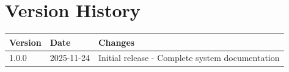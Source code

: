 \documentclass[11pt,letterpaper]{article}
\begin{document}

\section{Version History}

\begin{table}[H]
\centering
\begin{tabularx}{\textwidth}{llX}
\toprule
\textbf{Version} & \textbf{Date} & \textbf{Changes} \\
\midrule
1.0.0 & 2025-11-24 & Initial release - Complete system documentation \\
\bottomrule
\end{tabularx}
\end{table}

\end{document}
